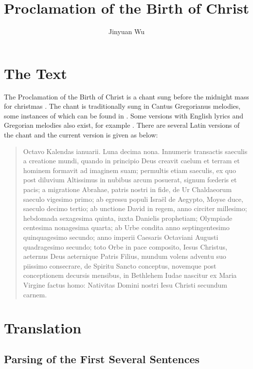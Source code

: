 \documentclass[a4paper]{article}
\title{Proclamation of the Birth of Christ}
\author{Jinyuan Wu}
\begin{document}
\maketitle

\section{The Text}

The Proclamation of the Birth of Christ is a chant sung before the midnight mass for christmas \cite{wiki}.
The chant is traditionally sung in Cantus Gregorianus melodies, some instances of which can be found in \cite{2016christmas, 2019christmas}. 
Some versions with English lyrics and Gregorian melodies also exist, for example \cite{eng-ver}.
There are several Latin versions of the chant and the current version is given as below: 

\begin{quotation}
    Octavo Kalendas ianuarii. Luna decima nona.
    Innumeris transactis saeculis a creatione mundi, quando in principio Deus creavit caelum et terram et hominem formavit ad imaginem suam;
    permultis etiam saeculis, ex quo post diluvium Altissimus in nubibus arcum posuerat, signum fœderis et pacis;
    a migratione Abrahae, patris nostri in fide, de Ur Chaldaeorum saeculo vigesimo primo;
    ab egressu populi Israël de Aegypto, Moyse duce, saeculo decimo tertio;
    ab unctione David in regem, anno circiter millesimo;
    hebdomada sexagesima quinta, iuxta Danielis prophetiam;
    Olympiade centesima nonagesima quarta;
    ab Urbe condita anno septingentesimo quinquagesimo secundo;
    anno imperii Caesaris Octaviani Augusti quadragesimo secundo;
    toto Orbe in pace composito, Iesus Christus, aeternus Deus aeternique Patris Filius, mundum volens adventu suo piissimo consecrare, de Spiritu Sancto conceptus, novemque post conceptionem decursis mensibus, in Bethlehem Iudae nascitur ex Maria Virgine factus homo:
    Nativitas Domini nostri Iesu Christi secundum carnem.
\end{quotation}

\section{Translation}

\subsection{Parsing of the First Several Sentences}
\end{document}
